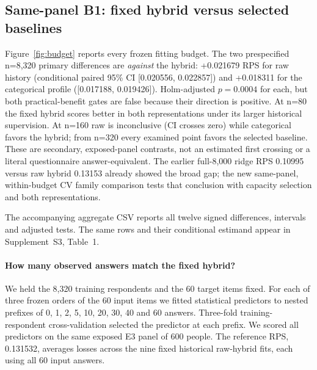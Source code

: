\documentclass[10pt,twocolumn]{article}
\newcommand{\CurrentApp}{Supplement~S3}
\begin{document}
\subsection{Same-panel B1: fixed hybrid versus selected baselines}
Figure~\ref{fig:budget} reports every frozen
fitting budget. The two prespecified n=8,320 primary differences are
\emph{against} the hybrid: +0.021679 RPS for raw history (conditional paired
95\% CI [0.020556, 0.022857]) and +0.018311 for the categorical profile
([0.017188, 0.019426]). Holm-adjusted $p=0.0004$ for each, but both
practical-benefit gates are false because their direction is positive.
At n=80 the fixed hybrid scores better in both representations under its
larger historical supervision. At n=160 raw is inconclusive (CI crosses
zero) while categorical favors the hybrid; from n=320 every examined point
favors the selected baseline. These are secondary, exposed-panel contrasts,
not an estimated first crossing or a literal questionnaire answer-equivalent.
The earlier full-8,000 ridge RPS 0.10995 versus raw hybrid 0.13153 already
showed the broad gap; the new same-panel, within-budget CV family comparison
tests that conclusion with capacity selection and both representations.

The accompanying aggregate CSV reports all twelve signed differences, intervals and adjusted tests.
The same rows and their conditional estimand appear in \CurrentApp{}, Table~1.

\paragraph{How many observed answers match the fixed hybrid?}
We held the 8,320 training respondents and the 60 target items fixed.
For each of three frozen orders of the 60 input items we fitted statistical
predictors to nested prefixes of 0, 1, 2, 5, 10, 20, 30, 40 and 60 answers.
Three-fold training-respondent cross-validation selected the predictor at
each prefix. We scored all predictors on the same exposed E3 panel of 600
people. The reference RPS, 0.131532, averages losses across the nine fixed
historical raw-hybrid fits, each using all 60 input answers.
\end{document}
